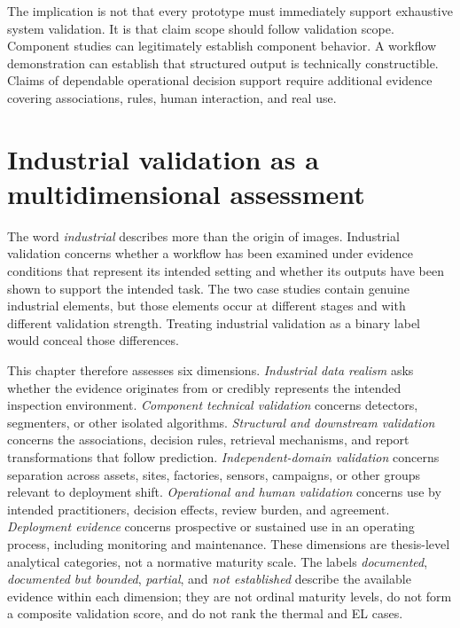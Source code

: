 \documentclass[12pt,a4paper]{report}
\begin{document}
The implication is not that every prototype must immediately support exhaustive system validation. It is that claim scope should follow validation scope. Component studies can legitimately establish component behavior. A workflow demonstration can establish that structured output is technically constructible. Claims of dependable operational decision support require additional evidence covering associations, rules, human interaction, and real use.

\section{Industrial validation as a multidimensional assessment}
\label{sec:ch07-industrial-validation}

The word \emph{industrial} describes more than the origin of images. Industrial validation concerns whether a workflow has been examined under evidence conditions that represent its intended setting and whether its outputs have been shown to support the intended task. The two case studies contain genuine industrial elements, but those elements occur at different stages and with different validation strength. Treating industrial validation as a binary label would conceal those differences.

This chapter therefore assesses six dimensions. \emph{Industrial data realism} asks whether the evidence originates from or credibly represents the intended inspection environment. \emph{Component technical validation} concerns detectors, segmenters, or other isolated algorithms. \emph{Structural and downstream validation} concerns the associations, decision rules, retrieval mechanisms, and report transformations that follow prediction. \emph{Independent-domain validation} concerns separation across assets, sites, factories, sensors, campaigns, or other groups relevant to deployment shift. \emph{Operational and human validation} concerns use by intended practitioners, decision effects, review burden, and agreement. \emph{Deployment evidence} concerns prospective or sustained use in an operating process, including monitoring and maintenance. These dimensions are thesis-level analytical categories, not a normative maturity scale. The labels \emph{documented}, \emph{documented but bounded}, \emph{partial}, and \emph{not established} describe the available evidence within each dimension; they are not ordinal maturity levels, do not form a composite validation score, and do not rank the thermal and EL cases.
\end{document}
